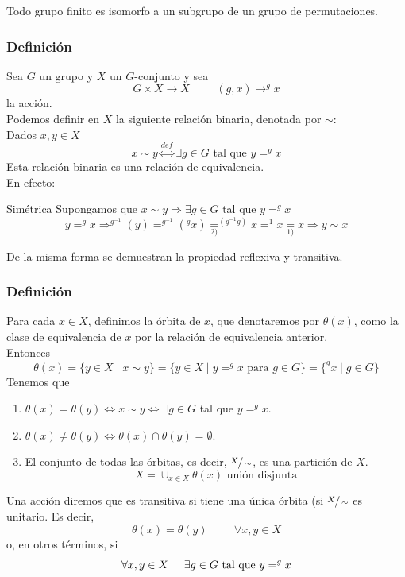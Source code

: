 \documentclass[11pt,a4paper]{article}
\begin{document}
Todo grupo finito es isomorfo a un subgrupo de un grupo de permutaciones.

\subsubsection*{Definición}

Sea $G$ un grupo y $X$ un $G$-conjunto y sea
$$G \times X \to X \hspace{1cm} (g, x) \mapsto ^{g}x$$
la acción. \\
Podemos definir en $X$ la siguiente relación binaria, denotada por $\sim$: \\
Dados $x, y \in X$
$$x \sim y \overset{def}{\iff} \exists g \in G \text{ tal que } y = ^{g}x$$
Esta relación binaria es una relación de equivalencia. \\
En efecto:
\begin{enumerate*}
\item[Simétrica] Supongamos que $x \sim y \Rightarrow \exists g \in G$ tal que $y = ^{g}x$
$$y = ^{g}x \Rightarrow ^{g^{-1}}(y) = ^{g^{-1}}(^{g}x) \underset{2)}{=} ^{(g^{-1}g)}x = ^{1}x \underset{1)}{=} x \Rightarrow y \sim x$$
\end{enumerate*}
De la misma forma se demuestran la propiedad reflexiva y transitiva.

\subsubsection*{Definición}

Para cada $x \in X$, definimos la órbita de $x$, que denotaremos por $\theta(x)$, como la clase de equivalencia de $x$ por la relación de equivalencia anterior. \\
Entonces
$$\theta(x) = \{y \in X \mid x \sim y\} = \{y \in X \mid y = ^{g}x \text{ para } g \in G\} = \{^{g}x \mid g \in G\}$$
Tenemos que
\begin{enumerate}[label = \arabic*)]
\item $\theta(x) = \theta(y) \iff x \sim y \iff \exists g \in G$ tal que $y = ^{g}x$.
\item $\theta(x) \neq \theta(y) \iff \theta(x) \cap \theta(y) = \emptyset$.
\item El conjunto de todas las órbitas, es decir, $\sfrac{X}{\sim}$, es una partición de $X$.
$$X = \cup_{x \in X} \theta(x) \text{ unión disjunta}$$
\end{enumerate}

Una acción diremos que es transitiva si tiene una única órbita (si $\sfrac{X}{\sim}$ es unitario. Es decir,
$$\theta(x) = \theta(y) \hspace{1cm} \forall x, y \in X$$
o, en otros términos, si
$$\forall x, y \in X \hspace{0.5cm} \exists g \in G \text{ tal que } y = ^{g}x$$
\end{document}

